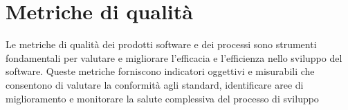 \section{Metriche di qualità}
Le metriche di qualità dei prodotti software e dei processi sono strumenti fondamentali per valutare e migliorare l'efficacia e l'efficienza nello sviluppo del software. Queste metriche forniscono indicatori oggettivi e misurabili che consentono di valutare la conformità agli standard, identificare aree di miglioramento e monitorare la salute complessiva del processo di sviluppo




